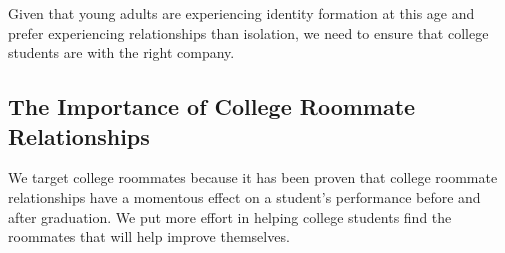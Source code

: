 \documentclass[journal]{./IEEE/IEEEtran}
\begin{document}
    Given that young adults are experiencing identity formation at this age and prefer experiencing relationships than isolation\cite{erb}, we need to ensure that college students are with the right company.

\subsection{The Importance of College Roommate Relationships}
    We target college roommates because it has been proven that college roommate relationships have a momentous effect on a student$’$s performance before and after graduation. We put more effort in helping college students find the roommates that will help improve themselves.
\end{document}
